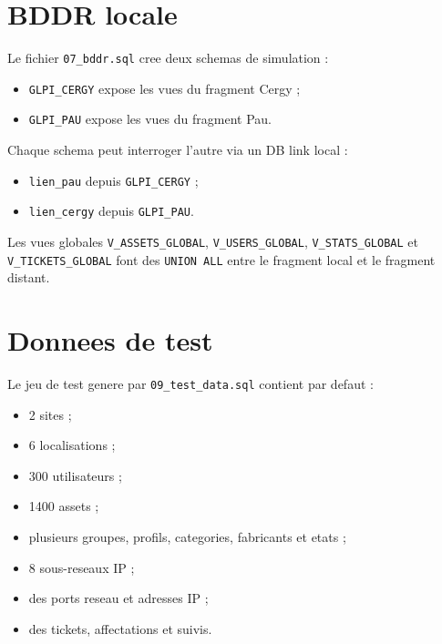 \documentclass[11pt,a4paper]{article}
\begin{document}
\section{BDDR locale}

Le fichier \texttt{07\_bddr.sql} cree deux schemas de simulation :

\begin{itemize}
  \item \texttt{GLPI\_CERGY} expose les vues du fragment Cergy ;
  \item \texttt{GLPI\_PAU} expose les vues du fragment Pau.
\end{itemize}

Chaque schema peut interroger l'autre via un DB link local :

\begin{itemize}
  \item \texttt{lien\_pau} depuis \texttt{GLPI\_CERGY} ;
  \item \texttt{lien\_cergy} depuis \texttt{GLPI\_PAU}.
\end{itemize}

Les vues globales \texttt{V\_ASSETS\_GLOBAL}, \texttt{V\_USERS\_GLOBAL}, \texttt{V\_STATS\_GLOBAL} et \texttt{V\_TICKETS\_GLOBAL} font des \texttt{UNION ALL} entre le fragment local et le fragment distant.

\section{Donnees de test}

Le jeu de test genere par \texttt{09\_test\_data.sql} contient par defaut :

\begin{itemize}
  \item 2 sites ;
  \item 6 localisations ;
  \item 300 utilisateurs ;
  \item 1400 assets ;
  \item plusieurs groupes, profils, categories, fabricants et etats ;
  \item 8 sous-reseaux IP ;
  \item des ports reseau et adresses IP ;
  \item des tickets, affectations et suivis.
\end{itemize}
\end{document}
